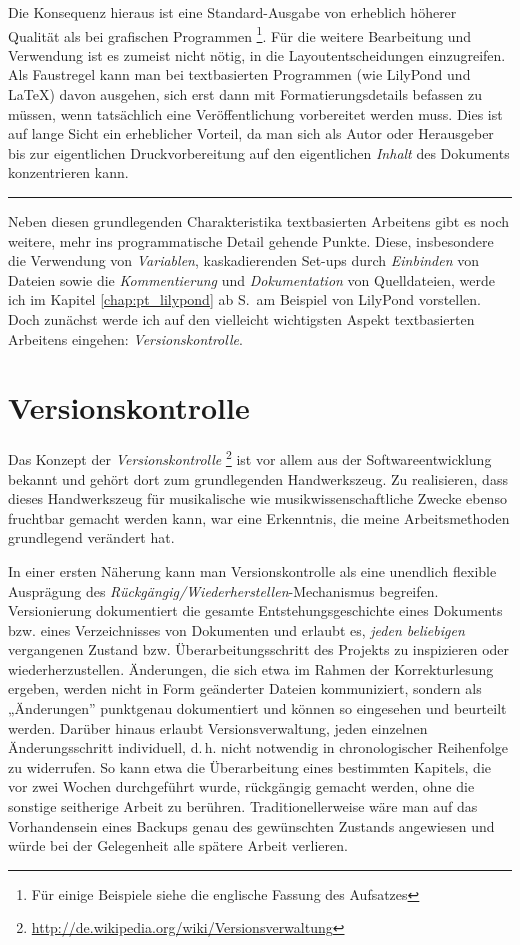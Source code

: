 \documentclass[DIV=12]{scrreprt}
\begin{document}
Die Konsequenz hieraus ist eine Standard-Ausgabe von erheblich höherer Qualität als bei grafischen Programmen%
\footnote{Für einige Beispiele siehe die englische Fassung des Aufsatzes}.
Für die weitere Bearbeitung und Verwendung ist es zumeist nicht nötig, in die Layout\-entscheidungen einzugreifen.
Als Faustregel kann man bei textbasierten Programmen (wie LilyPond und \LaTeX) davon ausgehen, sich erst dann mit Formatierungsdetails befassen zu müssen, wenn tatsächlich eine Veröffentlichung vorbereitet werden muss.
Dies ist auf lange Sicht ein erheblicher Vorteil, da man sich als Autor oder Herausgeber bis zur eigentlichen Druckvorbereitung auf den eigentlichen \emph{Inhalt} des Dokuments konzentrieren kann.

\bigskip
\hrule
\bigskip

Neben diesen grundlegenden Charakteristika textbasierten Arbeitens gibt es noch weitere, mehr ins programmatische Detail gehende Punkte.
Diese, insbesondere die Verwendung von \emph{Variablen}, kaskadierenden Set-ups durch \emph{Einbinden} von Dateien sowie die \emph{Kommentierung} und \emph{Dokumentation} von Quelldateien, werde ich im Kapitel \ref{chap:pt_lilypond} ab S.\,\pageref{chap:pt_lilypond} am Beispiel von LilyPond vorstellen.
Doch zunächst werde ich auf den vielleicht wichtigsten Aspekt textbasierten Arbeitens eingehen: \emph{Versionskontrolle}.

\chapter{Versionskontrolle} 
\label{chap:pt_version-control}
Das Konzept der \emph{Versionskontrolle}%
\footnote{\url{http://de.wikipedia.org/wiki/Versionsverwaltung}}
ist vor allem aus der Softwareentwicklung bekannt und gehört dort zum grundlegenden Handwerkszeug.
Zu realisieren, dass dieses Handwerkszeug für musikalische wie musikwissenschaftliche Zwecke ebenso fruchtbar gemacht werden kann, war eine Erkenntnis, die meine Arbeitsmethoden grundlegend verändert hat.

In einer ersten Näherung kann man Versionskontrolle als eine unendlich flexible Ausprägung des \emph{Rückgängig/Wiederherstellen}-Mechanismus begreifen.
Versionierung dokumentiert die gesamte Entstehungsgeschichte eines Dokuments bzw. eines Verzeichnisses von Dokumenten und erlaubt es, \emph{jeden beliebigen} vergangenen Zustand bzw. Überarbeitungsschritt des Projekts zu inspizieren oder wiederherzustellen.
Änderungen, die sich etwa im Rahmen der Korrekturlesung ergeben, werden nicht in Form geänderter Dateien kommuniziert, sondern als „Änderungen” punktgenau dokumentiert und können so eingesehen und beurteilt werden.
Darüber hinaus erlaubt Versionsverwaltung, jeden einzelnen Änderungsschritt individuell, d.\,h. nicht notwendig in chronologischer Reihenfolge zu widerrufen.
So kann etwa die Überarbeitung eines bestimmten Kapitels, die vor zwei Wochen durchgeführt wurde, rückgängig gemacht werden, ohne die sonstige seitherige Arbeit zu berühren.
Traditionellerweise wäre man auf das Vorhandensein eines Backups genau des gewünschten Zustands angewiesen und würde bei der Gelegenheit alle spätere Arbeit verlieren.
\end{document}
